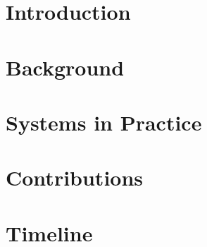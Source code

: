
\section{Introduction}


\section{Background}


\section{Systems in Practice}

\section{Contributions}

\section{Timeline}


